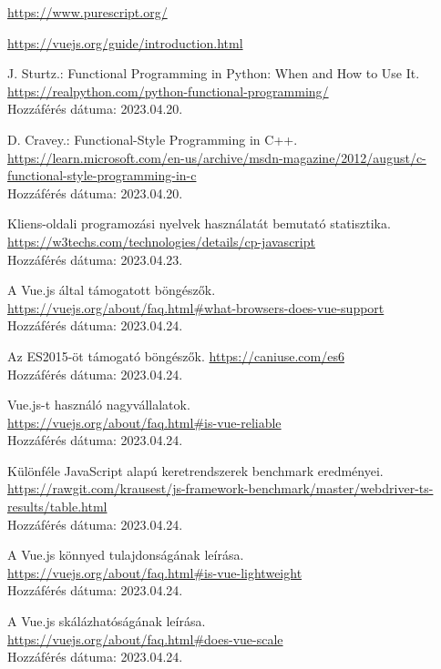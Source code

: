 \documentclass[12pt]{article}
\begin{document}
\begin{thebibliography}{99}
\url{https://www.purescript.org/}

\url{https://vuejs.org/guide/introduction.html}

J. Sturtz.: Functional Programming in Python: When and How to Use It. \\
\url{https://realpython.com/python-functional-programming/}\\Hozzáférés dátuma: 2023.04.20.

D. Cravey.: Functional-Style Programming in C++. \\
\url{https://learn.microsoft.com/en-us/archive/msdn-magazine/2012/august/c-functional-style-programming-in-c}
\\Hozzáférés dátuma: 2023.04.20.

Kliens-oldali programozási nyelvek használatát bemutató statisztika. \\ \url{https://w3techs.com/technologies/details/cp-javascript}  \\Hozzáférés dátuma: 2023.04.23.

A Vue.js által támogatott böngészők. \\ \url{https://vuejs.org/about/faq.html#what-browsers-does-vue-support}\\ Hozzáférés dátuma: 2023.04.24.

Az ES2015-öt támogató böngészők. \url{https://caniuse.com/es6} \\Hozzáférés dátuma: 2023.04.24.

Vue.js-t használó nagyvállalatok. \\ \url{https://vuejs.org/about/faq.html#is-vue-reliable} \\Hozzáférés dátuma: 2023.04.24.

Különféle JavaScript alapú keretrendszerek benchmark eredményei. \\ \url{https://rawgit.com/krausest/js-framework-benchmark/master/webdriver-ts-results/table.html}\\ Hozzáférés dátuma: 2023.04.24.

A Vue.js könnyed tulajdonságának leírása. \\ \url{https://vuejs.org/about/faq.html#is-vue-lightweight} \\Hozzáférés dátuma: 2023.04.24.

A Vue.js skálázhatóságának leírása. \\ \url{https://vuejs.org/about/faq.html#does-vue-scale}\\ Hozzáférés dátuma: 2023.04.24.


\end{thebibliography}
\end{document}
